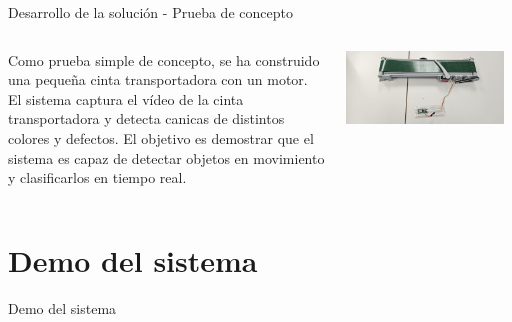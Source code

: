 \documentclass[spanish]{beamer}
\begin{document}
\begin{frame}{Desarrollo de la solución - Prueba de concepto}
    \begin{columns}
        \begin{column}{0.5\textwidth}
            Como prueba simple de concepto, se ha construido una pequeña cinta transportadora con un motor. El sistema captura el vídeo de la cinta transportadora y detecta canicas de distintos colores y defectos. El objetivo es demostrar que el sistema es capaz de detectar objetos en movimiento y clasificarlos en tiempo real.


        \end{column}
        \begin{column}{0.5\textwidth}
            \includegraphics[width=0.95\textwidth]{images/solucion_propuesta/cinta_transportadora_construccion.jpeg}
        \end{column}
    \end{columns}
\end{frame}

\section{Demo del sistema}
\begin{frame}{Demo del sistema}
    \begin{center}
    \end{center}
\end{frame}
\end{document}
